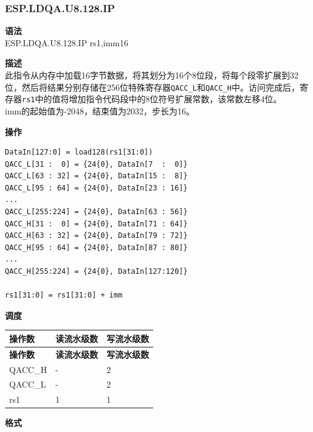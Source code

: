 \newpage
\subsubsection{ESP.LDQA.U8.128.IP}\label{instruction:ESPLDQAU8128IP}
\textbf{语法}\\
ESP.LDQA.U8.128.IP rs1,imm16

\textbf{描述}\\
此指令从内存中加载16字节数据，将其划分为16个8位段，将每个段零扩展到32位，然后将结果分别存储在256位特殊寄存器\lstinline{QACC_L}和\lstinline{QACC_H}中。访问完成后，寄存器\lstinline{rs1}中的值将增加指令代码段中的8位符号扩展常数，该常数左移4位。\\

imm的起始值为-2048，结束值为2032，步长为16。

\textbf{操作}
\begin{lstlisting}
DataIn[127:0] = load128(rs1[31:0])
QACC_L[31 :  0] = {24{0}, DataIn[7  :  0]}
QACC_L[63 : 32] = {24{0}, DataIn[15 :  8]}
QACC_L[95 : 64] = {24{0}, DataIn[23 : 16]}
...
QACC_L[255:224] = {24{0}, DataIn[63 : 56]}
QACC_H[31 :  0] = {24{0}, DataIn[71 : 64]}
QACC_H[63 : 32] = {24{0}, DataIn[79 : 72]}
QACC_H[95 : 64] = {24{0}, DataIn[87 : 80]}
...
QACC_H[255:224] = {24{0}, DataIn[127:120]}

rs1[31:0] = rs1[31:0] + imm
\end{lstlisting}

\textbf{调度}\\
\begin{longtable}[c]{|l|l|l|}
    \hline
    \rowcolor{lightgray}
    \textbf{操作数} & \textbf{读流水级数} & \textbf{写流水级数} \\\hline
    \endfirsthead
    \hline
    \rowcolor{lightgray}
     \textbf{操作数} & \textbf{读流水级数} & \textbf{写流水级数} \\\hline
    \endhead
    \hline
    \endfoot

  QACC\_H & - & 2 \\\hline
    QACC\_L & - & 2 \\\hline
  rs1 & 1 & 1

\end{longtable}

\textbf{格式}\\


